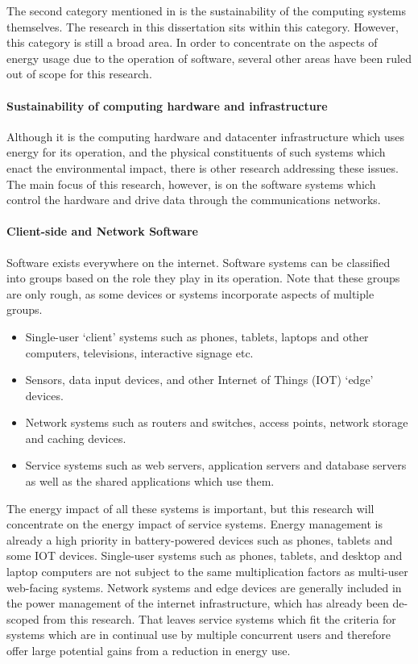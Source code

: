 The second category mentioned in \citet{Penzenstadler2013} is the sustainability of the computing systems themselves. The research in this dissertation sits within this category. However, this category is still a broad area. In order to concentrate on the aspects of energy usage due to the operation of software, several other areas have been ruled out of scope for this research.

\paragraph{Sustainability of computing hardware and infrastructure}

Although it is the computing hardware and datacenter infrastructure which uses energy for its operation, and the physical constituents of such systems which enact the environmental impact, there is other research addressing these issues. The main focus of this research, however, is on the software systems which control the hardware and drive data through the communications networks.

\paragraph{Client-side and Network Software}

Software exists everywhere on the internet. Software systems can be classified into groups based on the role they play in its operation. Note that these groups are only rough, as some devices or systems incorporate aspects of multiple groups.
\begin{itemize}
    \item Single-user `client' systems such as phones, tablets, laptops and other computers, televisions, interactive signage etc.
    \item Sensors, data input devices, and other Internet of Things (IOT) `edge' devices.
    \item Network systems such as routers and switches, access points, network storage and caching devices.
    \item Service systems such as web servers, application servers and database servers as well as the shared applications which use them.
\end{itemize}

The energy impact of all these systems is important, but this research will concentrate on the energy impact of service systems. Energy management is already a high priority in battery-powered devices such as phones, tablets and some IOT devices. Single-user systems such as phones, tablets, and desktop and laptop computers are not subject to the same multiplication factors as multi-user web-facing systems. Network systems and edge devices are generally included in the power management of the internet infrastructure, which has already been de-scoped from this research. That leaves service systems which fit the criteria for systems which are in continual use by multiple concurrent users and therefore offer large potential gains from a reduction in energy use.

